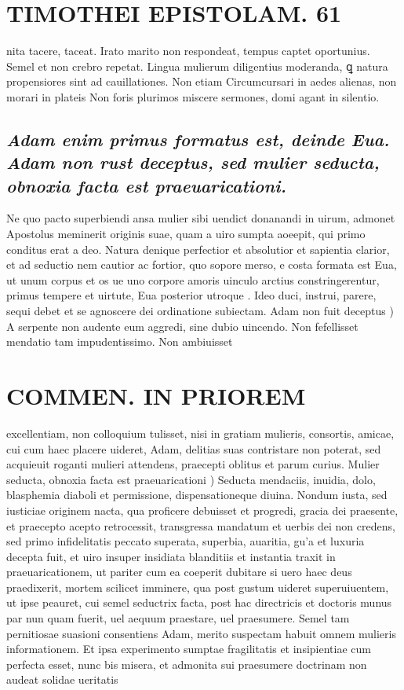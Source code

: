 \documentclass{article}
\begin{document}
\begin{pages}
\section*{TIMOTHEI EPISTOLAM. 61 }\pstart nita tacere, taceat. Irato marito non respondeat, tempus captet oportunius. Semel et non crebro repetat. Lingua mulierum diligentius moderanda, ꝗ natura propensiores sint ad cauillationes. Non etiam Circumcursari in aedes alienas, non morari in plateis Non foris plurimos miscere sermones, domi agant in silentio.  \pend
{}
{}
\subsection*{\textit{Adam enim primus formatus est, deinde Eua. Adam non rust deceptus, sed mulier seducta, obnoxia facta est praeuaricationi. }}\pstart Ne quo pacto superbiendi ansa mulier sibi uendict donanandi in uirum, admonet Apostolus meminerit originis suae, quam a uiro sumpta aoeepit, qui primo conditus erat a deo. Natura denique perfectior et absolutior et sapientia clarior, et ad seductio nem cautior ac fortior, quo sopore merso, e costa formata est Eua, ut unum corpus et os ue uno corpore amoris uinculo arctius constringerentur, primus tempere et uirtute, Eua posterior utroque . Ideo duci, instrui, parere, sequi debet et se agnoscere dei ordinatione subiectam.  \pend\pstart Adam non fuit deceptus ) A serpente non audente eum aggredi, sine dubio uincendo. Non fefellisset mendatio tam impudentissimo. Non ambiuisset  \pend
\section*{COMMEN. IN PRIOREM }
\marginpar{[ p.62 ]}\pstart excellentiam, non colloquium tulisset, nisi in gratiam mulieris, consortis, amicae, cui cum haec placere uideret, Adam, delitias suas contristare non poterat, sed acquieuit roganti mulieri attendens, praecepti oblitus et parum curius.  \pend\pstart Mulier seducta, obnoxia facta est praeuaricationi )  Seducta mendaciis, inuidia, dolo, blasphemia diaboli et permissione, dispensationeque diuina. Nondum iusta, sed iusticiae originem nacta, qua proficere debuisset et progredi, gracia dei praesente, et praecepto acepto retrocessit, transgressa mandatum et uerbis dei non credens, sed primo infidelitatis peccato superata, superbia, auaritia, gu’a et luxuria decepta fuit, et uiro insuper insidiata blanditiis et instantia traxit in praeuaricationem, ut pariter cum ea coeperit dubitare si uero haec deus praedixerit, mortem scilicet imminere, qua post gustum uideret superuiuentem, ut ipse peauret, cui semel seductrix facta, post hac directricis et doctoris munus par nun quam fuerit, uel aequum praestare, uel praesumere. Semel tam pernitiosae suasioni consentiens Adam, merito suspectam habuit omnem mulieris informationem. Et ipsa experimento sumptae fragilitatis et insipientiae cum perfecta esset, nunc bis misera, et admonita sui praesumere doctrinam non audeat solidae ueritatis  \pend

\end{pages}
\end{document}
